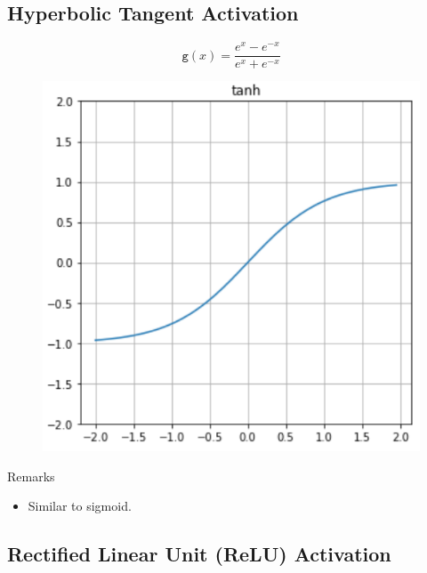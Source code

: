 \documentclass{book}
\newcommand{\act}{\texttt{g}}%
\begin{document}
\subsection{Hyperbolic Tangent Activation}

\begin{figure}[h]
    \centering
    \begin{minipage}{.5\textwidth}
        \[
        \act(x)= \frac{e^x - e^{-x}}{e^x + e^{-x}}
        \]
    \end{minipage}%
    \begin{minipage}{.5\textwidth}
        \centering
        \includegraphics[width=.8\textwidth]{act_tanh.png}
    \end{minipage}
\end{figure}

\begin{myblock}{Remarks}
\begin{itemize}
\item Similar to sigmoid.
\end{itemize}
\end{myblock}

\subsection{Rectified Linear Unit (ReLU) Activation}
\end{document}
